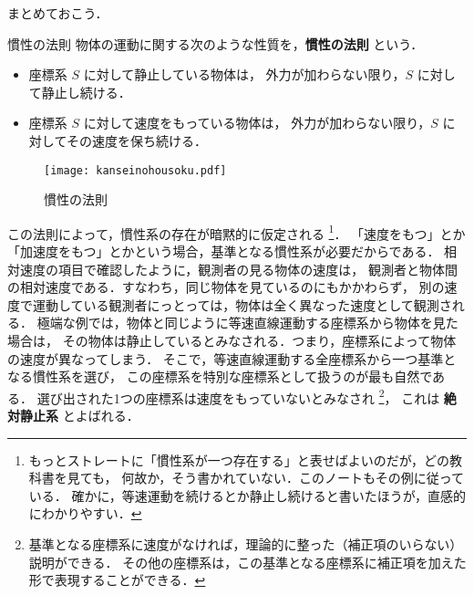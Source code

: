                 まとめておこう．
                \begin{myshadebox}{慣性の法則}
                    物体の運動に関する次のような性質を，\textbf{慣性の法則} という．
                    \begin{itemize}
                        \item 座標系 $S$ に対して静止している物体は，
                              外力が加わらない限り，$S$ に対して静止し続ける．
                        \item 座標系 $S$ に対して速度をもっている物体は，
                              外力が加わらない限り，$S$ に対してその速度を保ち続ける．
                    \end{itemize}
                \end{myshadebox}
                \begin{figure}[hbt]
                    \begin{center}
                        \texttt{[image: kanseinohousoku.pdf]}
                        \caption{慣性の法則}
                        \label{fig:kanseinohousoku}
                    \end{center}
                \end{figure}

                この法則によって，慣性系の存在が暗黙的に仮定される
                    \footnote{
                        もっとストレートに「慣性系が一つ存在する」と表せばよいのだが，どの教科書を見ても，
                        何故か，そう書かれていない．このノートもその例に従っている．
                        確かに，等速運動を続けるとか静止し続けると書いたほうが，直感的にわかりやすい．
                    }．
                「速度をもつ」とか「加速度をもつ」とかという場合，基準となる慣性系が必要だからである．
                相対速度の項目で確認したように，観測者の見る物体の速度は，
                観測者と物体間の相対速度である．すなわち，同じ物体を見ているのにもかかわらず，
                別の速度で運動している観測者にっとっては，物体は全く異なった速度として観測される．
                極端な例では，物体と同じように等速直線運動する座標系から物体を見た場合は，
                その物体は静止しているとみなされる．つまり，座標系によって物体の速度が異なってしまう．
                そこで，等速直線運動する全座標系から一つ基準となる慣性系を選び，
                この座標系を特別な座標系として扱うのが最も自然である．
                選び出された1つの座標系は速度をもっていないとみなされ
                  \footnote{
                    基準となる座標系に速度がなければ，理論的に整った（補正項のいらない）説明ができる．
                    その他の座標系は，この基準となる座標系に補正項を加えた形で表現することができる．
                  }，
                これは \textbf{絶対静止系} とよばれる．

